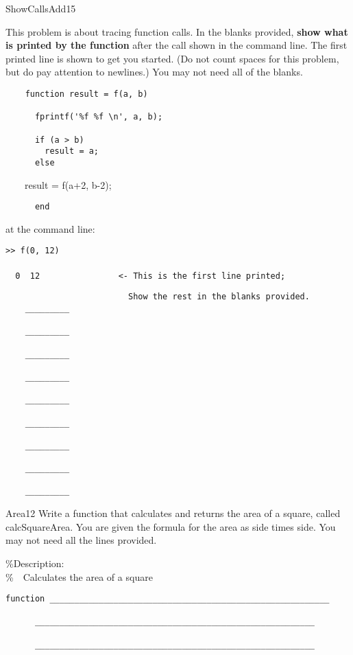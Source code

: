 \documentclass[master]{exam}
\begin{document}
\begin{problem}[require=careful]{ShowCallsAdd}{15}

    This problem is about tracing function calls. In the blanks provided,
    \textbf{show what is printed by the function} after the call shown in the
    command line. The first printed line is shown to get you started. (Do not count spaces for this problem, but do pay attention to newlines.) You may not need all of the blanks.
    \begin{verbatim}
    function result = f(a, b)
      
      fprintf('%f %f \n', a, b);
      
      if (a > b)
        result = a;
      else\end{verbatim}
    \ \ \ \ result = f(a+2, b-2);
    \begin{verbatim}
      end
    \end{verbatim}

    at the command line:

    \texttt{>> f(0, 12)\\
    \\%
    \ \ 0 \ 12\ \ \ \ \ \ \ \ \ \ \ \ \ \ \ \ <- This is the first line printed;}
    \begin{verbatim}
                         Show the rest in the blanks provided.
    _________

    _________

    _________

    _________

    _________

    _________

    _________

    _________

    _________
    \end{verbatim}
\end{problem}


\begin{problem}{Area}{12}
    \label{ca} Write a function that
    calculates and returns the area of
    a square,
    called calcSquareArea. You
    are given the formula for the area as side times
    side. You may not
    need all the lines provided.

    \%Description:\\
    \%\ \ Calculates the area of a square
    \begin{verbatim}function _________________________________________________________

      _________________________________________________________

      _________________________________________________________
    \end{verbatim}
\end{problem}
\end{document}
